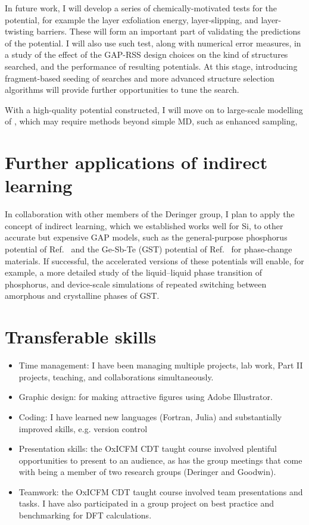 \documentclass[12pt,a4paper,twoside,nobind]{ociamthesis}
\begin{document}
In future work, I will develop a series of chemically-motivated tests
 for the potential, for example the layer exfoliation energy, layer-slipping, and layer-twisting barriers. 
 These will form an important part of validating the predictions of the potential. 
 I will also use such test, along with numerical error measures,
 in a study of the effect of the GAP-RSS design choices on the kind of structures searched, and the performance of resulting potentials. 
 At this stage, introducing fragment-based seeding of searches and more advanced structure selection algorithms will
 provide further opportunities to tune the search.

 With a high-quality  potential constructed, I will move on to large-scale modelling of , which may require methods beyond simple MD, such as enhanced sampling, 


\section{Further applications of indirect learning}

In collaboration with other members of the Deringer group, I plan to apply the concept of indirect learning, which we established works well for Si, to other accurate but expensive GAP models, such as the general-purpose phosphorus potential
of Ref.\ \cite{Deringer2020} and the Ge-Sb-Te (GST) potential of Ref.\ \cite{Zhou2022} for phase-change materials. If successful, the accelerated versions of these potentials will enable, for example, a more detailed study of the liquid--liquid phase
transition of phosphorus, and device-scale simulations of repeated switching between amorphous and crystalline phases of GST.


\clearpage
%
\printbibliography

%
\clearpage
\startappendices
\small
\section*{Transferable skills}
\begin{itemize}
  \item Time management: I have been managing multiple projects, lab work, Part II projects, teaching, and collaborations simultaneously.
  \item Graphic design: for making attractive figures using Adobe Illustrator.
  \item Coding: I have learned new languages (Fortran, Julia) and substantially improved skills, e.g. version control
  \item Presentation skills: the OxICFM CDT taught course involved plentiful opportunities to present to an audience, as has the group meetings that come with being a member of two research groups (Deringer and Goodwin).
  \item Teamwork: the OxICFM CDT taught course involved team presentations and tasks. I have also participated in a group project on best practice and benchmarking for DFT calculations.
\end{itemize}
\end{document}
